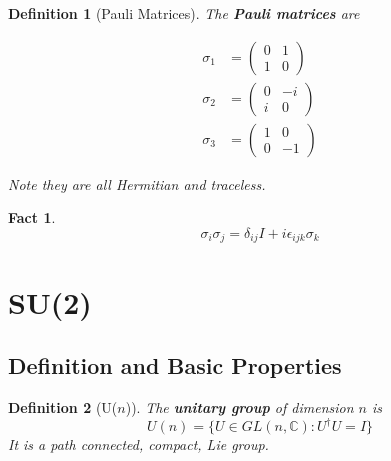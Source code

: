 \documentclass{article}
\newtheorem{definition}{Definition}[subsection]
\newtheorem{fact}{Fact}[subsection]
\newcommand{\bam}[1]{\textbf{#1}}
\newcommand{\mbb}[1]{\mathbb{#1}}
\newcommand{\be}{\begin{equation}}
\newcommand{\ee}{\end{equation}}
\begin{document}
\begin{definition}[Pauli Matrices]
The \bam{Pauli matrices} are

\begin{align*}
\sigma_1 &= \begin{pmatrix} 0 & 1 \\ 1 & 0\end{pmatrix}  \\
\sigma_2 &= \begin{pmatrix} 0 & -i \\ i & 0\end{pmatrix}  \\
\sigma_3 &= \begin{pmatrix} 1 & 0 \\ 0 & -1\end{pmatrix}  
\end{align*}

Note they are all Hermitian and traceless.
\end{definition}

\begin{fact}
\be
\sigma_i \sigma_j = \delta_{ij}I +i\epsilon_{ijk}\sigma_k
\ee
\end{fact}

\section{SU(2)}
\subsection{Definition and Basic Properties}

\begin{definition}[U($n$)]
The \bam{unitary group} of dimension $n$ is 
\[
U\left(n\right)=\lbrace U\in GL\left(n,\mbb{C}\right) : U^\dagger U=I \rbrace
\]
It is a path connected, compact, Lie group.
\end{definition}
\end{document}
